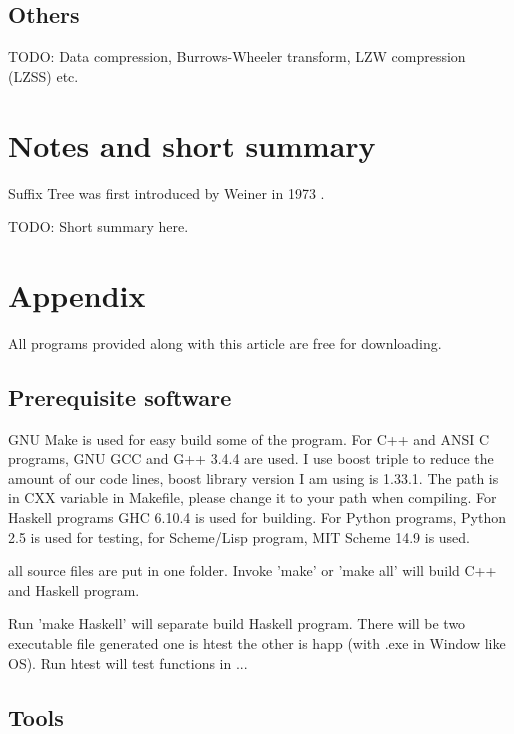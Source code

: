 \documentclass{article}
\begin{document}
\subsection{Others}
TODO: Data compression, Burrows-Wheeler transform, LZW compression (LZSS)
etc.

\section{Notes and short summary}

Suffix Tree was first introduced by Weiner in 1973 \cite{weiner}.

TODO: Short summary here.

\section{Appendix} \label{appendix}
All programs provided along with this article are free for
downloading.

\subsection{Prerequisite software}
GNU Make is used for easy build some of the program. For C++ and ANSI C programs,
GNU GCC and G++ 3.4.4 are used. I use boost triple to reduce the
amount of our code lines, boost library version I am using is
1.33.1. The path is in CXX variable in Makefile, please change it to
your path when compiling.
For Haskell programs GHC 6.10.4 is used
for building. For Python programs, Python 2.5 is used for testing, for
Scheme/Lisp program, MIT Scheme 14.9 is used.

all source files are put in one folder. Invoke 'make' or 'make all'
will build C++ and Haskell program. 

Run 'make Haskell' will separate build Haskell program. There will be
two executable file generated one is htest the other is happ (with .exe
in Window like OS). Run htest will test functions in ...

\subsection{Tools}
\end{document}
